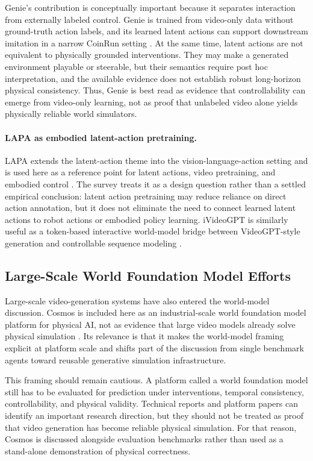 Genie's contribution is conceptually important because it separates interaction from externally labeled control. Genie is trained from video-only data without ground-truth action labels, and its learned latent actions can support downstream imitation in a narrow CoinRun setting \cite{bruce2024_genie_prov}. At the same time, latent actions are not equivalent to physically grounded interventions. They may make a generated environment playable or steerable, but their semantics require post hoc interpretation, and the available evidence does not establish robust long-horizon physical consistency. Thus, Genie is best read as evidence that controllability can emerge from video-only learning, not as proof that unlabeled video alone yields physically reliable world simulators.

\paragraph{LAPA as embodied latent-action pretraining.}
LAPA extends the latent-action theme into the vision-language-action setting and is used here as a reference point for latent actions, video pretraining, and embodied control \cite{ye2025lapa_prov}. The survey treats it as a design question rather than a settled empirical conclusion: latent action pretraining may reduce reliance on direct action annotation, but it does not eliminate the need to connect learned latent actions to robot actions or embodied policy learning. iVideoGPT is similarly useful as a token-based interactive world-model bridge between VideoGPT-style generation and controllable sequence modeling \cite{wu2024ivideogpt}.

\subsection{Large-Scale World Foundation Model Efforts}

Large-scale video-generation systems have also entered the world-model discussion. Cosmos is included here as an industrial-scale world foundation model platform for physical AI, not as evidence that large video models already solve physical simulation \cite{nvidia2025cosmos}. Its relevance is that it makes the world-model framing explicit at platform scale and shifts part of the discussion from single benchmark agents toward reusable generative simulation infrastructure.

This framing should remain cautious. A platform called a world foundation model still has to be evaluated for prediction under interventions, temporal consistency, controllability, and physical validity. Technical reports and platform papers can identify an important research direction, but they should not be treated as proof that video generation has become reliable physical simulation. For that reason, Cosmos is discussed alongside evaluation benchmarks rather than used as a stand-alone demonstration of physical correctness.

